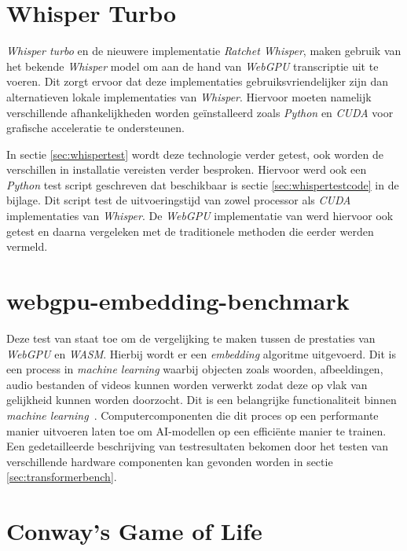 \section{Whisper Turbo}

\textit{Whisper turbo} en de nieuwere implementatie \textit{Ratchet Whisper}, maken gebruik van het bekende \textit{Whisper} model om aan de hand van \textit{WebGPU} transcriptie uit te voeren. Dit zorgt ervoor dat deze implementaties  gebruiksvriendelijker zijn dan alternatieven lokale implementaties van \textit{Whisper}. Hiervoor moeten namelijk verschillende afhankelijkheden worden geïnstalleerd zoals \textit{Python} en \textit{CUDA} voor grafische acceleratie te ondersteunen. 

\bigbreak{}

In sectie \ref{sec:whispertest} wordt deze technologie verder getest, ook worden de verschillen in installatie vereisten verder besproken. Hiervoor werd ook een \textit{Python} test script geschreven dat beschikbaar is sectie \ref{sec:whispertestcode} in de bijlage. Dit script test de uitvoeringstijd van zowel processor als \textit{CUDA} implementaties van \textit{Whisper}. De \textit{WebGPU} implementatie van \textcite{Fleetwood2024} werd hiervoor ook getest en daarna vergeleken met de traditionele methoden die eerder werden vermeld.

\section{webgpu-embedding-benchmark}

Deze test van \textcite{Lochner2024} staat toe om de vergelijking te maken tussen de prestaties van \textit{WebGPU} en \textit{WASM}. Hierbij wordt er een \textit{embedding} algoritme uitgevoerd. Dit is een process in \textit{machine learning} waarbij objecten zoals woorden, afbeeldingen, audio bestanden of videos kunnen worden verwerkt zodat deze op vlak van gelijkheid kunnen worden doorzocht. Dit is een belangrijke functionaliteit binnen \textit{machine learning}~\autocite{Cloudflare2024}. Computercomponenten die dit proces op een performante manier uitvoeren laten toe om AI-modellen op een efficiënte manier te trainen. Een gedetailleerde beschrijving van testresultaten bekomen door het testen van verschillende hardware componenten kan gevonden worden in sectie \ref{sec:transformerbench}.

\section{Conway's Game of Life}

